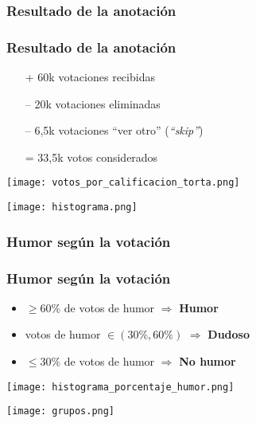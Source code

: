 \subsubsection{Resultado de la anotación}
\begin{frame}[allowframebreaks]
    \frametitle{Resultado de la anotación}

    \begin{itemize}
        \item[+] 60k votaciones recibidas
        \item[--] 20k votaciones eliminadas
        \item[--] 6,5k votaciones “ver otro” (\emph{“skip”})
        \item[=] 33,5k votos considerados
    \end{itemize}

    \framebreak

    \begin{center}
        \texttt{[image: votos\_por\_calificacion\_torta.png]}

        \texttt{[image: histograma.png]}
    \end{center}
\end{frame}

\subsubsection{Humor según la votación}

\begin{frame}[allowframebreaks]
    \frametitle{Humor según la votación}

    \begin{itemize}
        \item $\geq 60\%$ de votos de humor $\Rightarrow$ \textbf{Humor}
        \item votos de humor $\in (30\%, 60\%)$ $\Rightarrow$ \textbf{Dudoso}
        \item $\leq 30\%$ de votos de humor $\Rightarrow$ \textbf{No humor}
    \end{itemize}

    \begin{center}
        \texttt{[image: histograma\_porcentaje\_humor.png]}

        \texttt{[image: grupos.png]}
    \end{center}
\end{frame}

